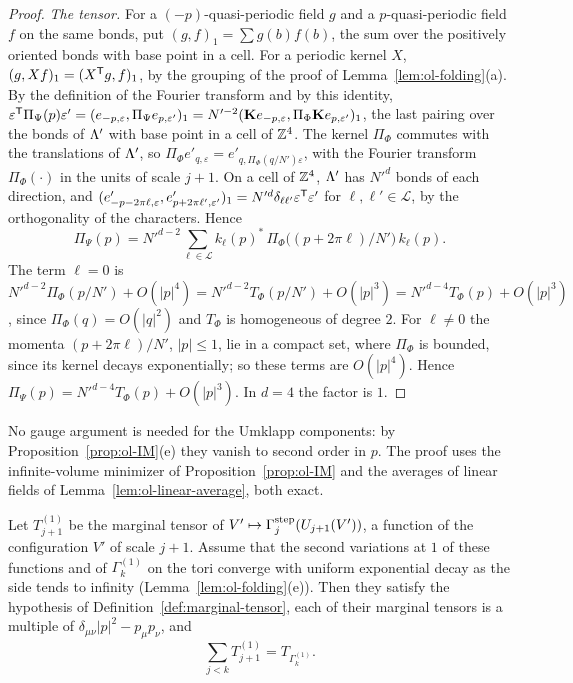\begin{proof}
\emph{The tensor.} For a $(-p)$-quasi-periodic field $g$ and a $p$-quasi-periodic field $f$ on the same bonds, put $(g,f)_1=\sum g(b)f(b)$, the sum over the positively oriented bonds with base point in a cell. For a periodic kernel $X$, $(g,Xf)_1=(X^{\sf T}g,f)_1$, by the grouping of the proof of Lemma~\ref{lem:ol-folding}(a). By the definition of the Fourier transform and by this identity, $\varepsilon^{\sf T}\Pi_\Psi(p)\varepsilon'=(e_{-p,\varepsilon},\Pi_\Psi e_{p,\varepsilon'})_1=N'^{-2}(\mathbf Ke_{-p,\varepsilon},\Pi_\Phi\mathbf Ke_{p,\varepsilon'})_1$, the last pairing over the bonds of $\Lambda'$ with base point in a cell of $\mathbb Z^4$. The kernel $\Pi_\Phi$ commutes with the translations of $\Lambda'$, so $\Pi_\Phi e'_{q,\varepsilon}=e'_{q,\Pi_\Phi(q/N')\varepsilon}$, with the Fourier transform $\Pi_\Phi(\cdot)$ in the units of scale $j+1$. On a cell of $\mathbb Z^4$, $\Lambda'$ has $N'^d$ bonds of each direction, and $(e'_{-p-2\pi\ell,\varepsilon},e'_{p+2\pi\ell',\varepsilon'})_1=N'^d\delta_{\ell\ell'}\varepsilon^{\sf T}\varepsilon'$ for $\ell,\ell'\in\mathcal L$, by the orthogonality of the characters. Hence
\[
\Pi_\Psi(p)=N'^{d-2}\sum_{\ell\in\mathcal L}k_\ell(p)^*\,\Pi_\Phi\big((p+2\pi\ell)/N'\big)\,k_\ell(p).
\]
The term $\ell=0$ is $N'^{d-2}\Pi_\Phi(p/N')+O(|p|^4)=N'^{d-2}T_\Phi(p/N')+O(|p|^3)=N'^{d-4}T_\Phi(p)+O(|p|^3)$, since $\Pi_\Phi(q)=O(|q|^2)$ and $T_\Phi$ is homogeneous of degree $2$. For $\ell\ne0$ the momenta $(p+2\pi\ell)/N'$, $|p|\le1$, lie in a compact set, where $\Pi_\Phi$ is bounded, since its kernel decays exponentially; so these terms are $O(|p|^4)$. Hence $\Pi_\Psi(p)=N'^{d-4}T_\Phi(p)+O(|p|^3)$. In $d=4$ the factor is $1$.
\end{proof}

No gauge argument is needed for the Umklapp components: by Proposition~\ref{prop:ol-IM}(e) they vanish to second order in $p$. The proof uses the infinite-volume minimizer of Proposition~\ref{prop:ol-IM} and the averages of linear fields of Lemma~\ref{lem:ol-linear-average}, both exact.

\begin{corollary}\label{cor:ol-cumulative}
Let $T^{(1)}_{j+1}$ be the marginal tensor of $V'\mapsto\Gamma^{\rm step}_j(U_{j+1}(V'))$, a function of the configuration $V'$ of scale $j+1$. Assume that the second variations at $1$ of these functions and of $\Gamma^{(1)}_k$ on the tori converge with uniform exponential decay as the side tends to infinity (Lemma~\ref{lem:ol-folding}(e)). Then they satisfy the hypothesis of Definition~\ref{def:marginal-tensor}, each of their marginal tensors is a multiple of $\delta_{\mu\nu}|p|^2-p_\mu p_\nu$, and
\[
\sum_{j<k}T^{(1)}_{j+1}=T_{\Gamma^{(1)}_k}.
\]
\end{corollary}


